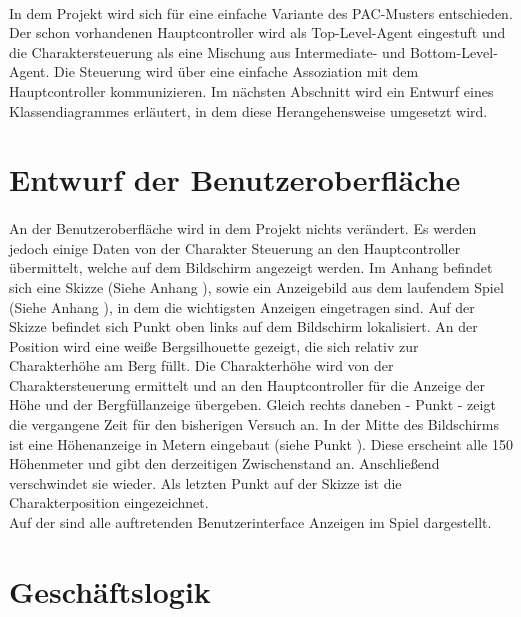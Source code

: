 \paragraph{}
In dem Projekt wird sich für eine einfache Variante des PAC-Musters entschieden. Der schon vorhandenen Hauptcontroller wird als Top-Level-Agent eingestuft und die Charaktersteuerung als eine Mischung aus Intermediate- und Bottom-Level-Agent. Die Steuerung wird über eine einfache Assoziation mit dem Hauptcontroller kommunizieren. Im nächsten Abschnitt wird ein Entwurf eines Klassendiagrammes erläutert, in dem diese Herangehensweise umgesetzt wird.

\section{Entwurf der Benutzeroberfläche}
\paragraph{}
An der Benutzeroberfläche wird in dem Projekt nichts verändert. Es werden jedoch einige Daten von der Charakter Steuerung an den Hauptcontroller übermittelt, welche auf dem Bildschirm angezeigt werden. Im Anhang befindet sich eine Skizze (Siehe Anhang ), sowie ein Anzeigebild aus dem laufendem Spiel (Siehe Anhang ), in dem die wichtigsten Anzeigen eingetragen sind. Auf der Skizze befindet sich Punkt  oben links auf dem Bildschirm lokalisiert. An der Position wird eine weiße Bergsilhouette gezeigt, die sich relativ zur Charakterhöhe am Berg füllt. Die Charakterhöhe wird von der Charaktersteuerung ermittelt und an den Hauptcontroller für die Anzeige der Höhe und der Bergfüllanzeige übergeben. Gleich rechts daneben - Punkt  - zeigt die vergangene Zeit für den bisherigen Versuch an. In der Mitte des Bildschirms ist eine Höhenanzeige in Metern eingebaut (siehe Punkt ). Diese erscheint alle 150 Höhenmeter und gibt den derzeitigen Zwischenstand an. Anschließend verschwindet sie wieder. Als letzten Punkt auf der Skizze ist die Charakterposition eingezeichnet. 
\\
Auf der  sind alle auftretenden Benutzerinterface Anzeigen im Spiel dargestellt.

\section{Geschäftslogik}
